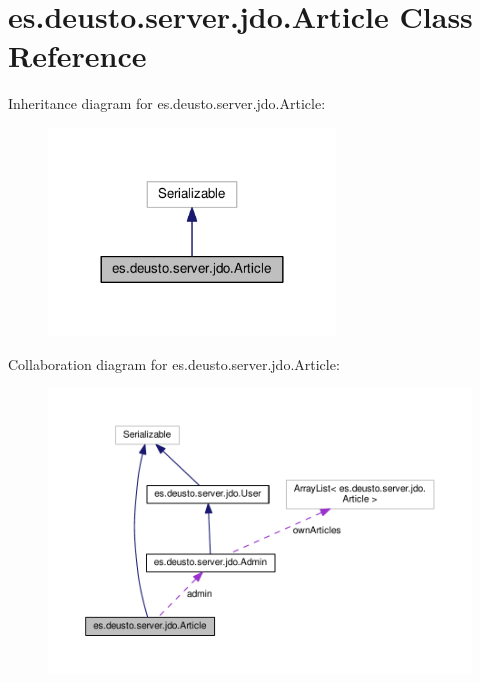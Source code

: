 \hypertarget{classes_1_1deusto_1_1server_1_1jdo_1_1_article}{}\section{es.\+deusto.\+server.\+jdo.\+Article Class Reference}
\label{classes_1_1deusto_1_1server_1_1jdo_1_1_article}


Inheritance diagram for es.\+deusto.\+server.\+jdo.\+Article\+:\nopagebreak
\begin{figure}[H]
\begin{center}
\leavevmode
\includegraphics[width=216pt]{classes_1_1deusto_1_1server_1_1jdo_1_1_article__inherit__graph}
\end{center}
\end{figure}


Collaboration diagram for es.\+deusto.\+server.\+jdo.\+Article\+:\nopagebreak
\begin{figure}[H]
\begin{center}
\leavevmode
\includegraphics[width=350pt]{classes_1_1deusto_1_1server_1_1jdo_1_1_article__coll__graph}
\end{center}
\end{figure}
